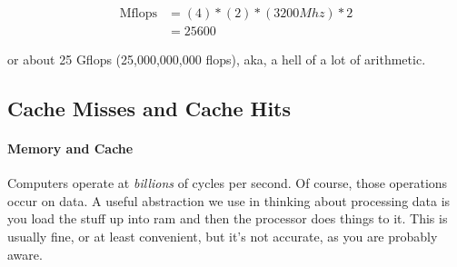 \begin{align*}
\text{Mflops} &= (4) * (2) * (3200 Mhz) * 2 \\ 
&= 25600 
\end{align*}

or about 25 Gflops (25,000,000,000 flops), aka, a hell of a lot of arithmetic.




\subsection{Cache Misses and Cache Hits}

\paragraph{Memory and Cache}

Computers operate at \emph{billions} of cycles per second.  Of course, those  
operations occur on data.  A useful abstraction we use in thinking about 
processing data is you load the stuff up into ram and then the processor does 
things to it.  This is usually fine, or at least convenient, but it's not 
accurate, as you are probably aware.  

